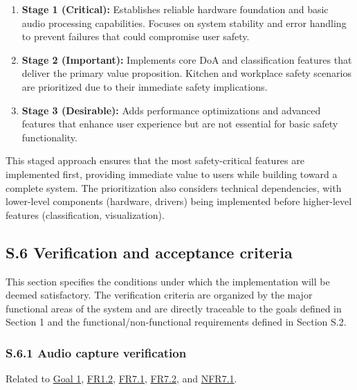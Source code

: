 \documentclass[12pt]{article}
\theoremstyle{definition}
\begin{document}
\begin{enumerate}
    \item \textbf{Stage 1 (Critical):} Establishes reliable hardware foundation
    and basic audio processing capabilities. Focuses on system stability and
    error handling to prevent failures that could compromise user safety.
    
    \item \textbf{Stage 2 (Important):} Implements core DoA and classification
    features that deliver the primary value proposition. Kitchen and workplace
    safety scenarios are prioritized due to their immediate safety implications.
    
    \item \textbf{Stage 3 (Desirable):} Adds performance optimizations and
    advanced features that enhance user experience but are not essential for
    basic safety functionality.
\end{enumerate}

This staged approach ensures that the most safety-critical features are
implemented first, providing immediate value to users while building toward a
complete system. The prioritization also considers technical dependencies, with
lower-level components (hardware, drivers) being implemented before higher-level
features (classification, visualization).

\subsection{S.6 Verification and acceptance criteria}

This section specifies the conditions under which the implementation will be
deemed satisfactory. The verification criteria are organized by the major
functional areas of the system and are directly traceable to the goals defined
in Section 1 and the functional/non-functional requirements defined in Section
S.2.

\subsubsection{S.6.1 Audio capture verification}

Related to \hyperref[goal:audio_capture]{Goal 1}, \hyperref[FR1_2]{FR1.2},
\hyperref[FR7_1]{FR7.1}, \hyperref[FR7_2]{FR7.2}, and \hyperref[NFR7_1]{NFR7.1}.
\end{document}

